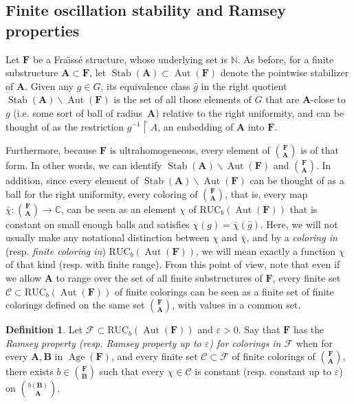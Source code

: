 \documentclass[11pt]{article}
\theoremstyle{definition}
\newtheorem{defi}[theo]{Definition}
\numberwithin{equation}{section}
\numberwithin{figure}{section}
\numberwithin{table}{section}
\newcommand{\N}{\mathbb{N}}
\newcommand{\CC}{\mathbb{C}}
\newcommand*{\mA}{\mathbf{A}}
\newcommand*{\mB}{\mathbf{B}}
\newcommand*{\mF}{\mathbf{F}}
\newcommand{\restrict}[2]{#1 \upharpoonright #2}
\newcommand{\e}{\varepsilon}
\DeclareMathOperator{\Aut}{Aut}
\DeclareMathOperator{\Stab}{Stab}
\DeclareMathOperator{\Age}{Age}
\newcommand{\RUCB}{\mathrm{RUC}_{b}}
\begin{document}
\subsection{Finite oscillation stability and Ramsey properties}
\label{section:colorings}

Let $\mF$ be a Fra\"{\i}ss\'e structure, whose underlying set is $\N$. As before, for a finite substructure $\mA \subset \mF$, let $\Stab(\mA) \subset \Aut(\mF)$ denote the pointwise stabilizer of $\mA$. Given any $g\in G$, its equivalence class $\bar g$ in the right quotient $\Stab(\mA)\backslash \Aut(\mF)$ is the set of all those elements of $G$ that are $\mA$-close to $g$ (i.e. some sort of ball of radius~$\mA$) relative to the right uniformity, and can be thought of as the restriction $\restrict{g^{-1}}{A}$, an embedding of $\mA$ into $\mF$.

Furthermore, because $\mF$ is ultrahomogeneous, every element of $\binom{\mF}{\mA}$ is of that form. In other words, we can identify $\Stab(\mA)\backslash \Aut(\mF)$ and $\binom{\mF}{\mA}$. In addition, since every element of $\Stab(\mA)\backslash \Aut(\mF)$ can be thought of as a ball for the right uniformity, every coloring of $\binom{\mF}{\mA}$, that is, every map $\bar\chi:\binom{\mF}{\mA}\rightarrow \CC$, can be seen as an element $\chi$ of $\RUCB(\Aut(\mF))$ that is constant on small enough balls and satisfies $\chi(g)=\bar\chi(\bar g)$. Here, we will not usually make any notational distinction between $\chi$ and $\bar\chi$, and by a \emph{coloring in} (resp. \emph{finite coloring in}) $\RUCB(\Aut(\mF))$, we will mean exactly a function $\chi$ of that kind (resp. with finite range). From this point of view, note that even if we allow $\mA$ to range over the set of all finite substructures of $\mF$, every finite set $\mathcal C \subset \RUCB(\Aut(\mF))$ of finite colorings can be seen as a finite set of finite colorings defined on the same set $\binom{\mF}{\mA}$, with values in a common set.

\begin{defi}
Let $\mathcal F \subset \RUCB(\Aut(\mF))$ and $\e>0$. Say that $\mF$ has the \emph{Ramsey property (resp. Ramsey property up to $\e$) for colorings in $\mathcal F$} when for every $\mA, \mB$ in $\Age(\mF)$, and every finite set $\mathcal C \subset \mathcal F$ of finite colorings of $\binom{\mF}{\mA}$, there exists $b\in \binom{\mF}{\mB}$ such that every $\chi\in \mathcal C$ is constant (resp. constant up to $\e$) on $\binom{b(\mB)}{\mA}$.
\end{defi}
\end{document}
